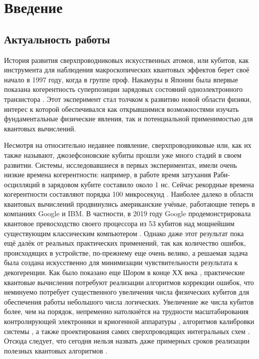 \documentclass[14pt, a4paper]{extreport}
\numberwithin{equation}{section}
\begin{document}
\tableofcontents

\chapter*{Введение}

\section*{Актуальность работы}

История развития сверхпроводниковых искусственных атомов, или кубитов, как инструмента для наблюдения макроскопических квантовых эффектов берет своё начало в 1997 году, когда в группе проф. Накамуры в Японии была впервые показана когерентность суперпозиции зарядовых состояний одноэлектронного транзистора \cite{nakamura1997spectroscopy}. Этот эксперимент стал толчком к развитию новой области физики, интерес к которой обеспечивался как открывшимися возможностями изучать фундаментальные физические явления, так и потенциальной применимостью для квантовых вычислений.

Несмотря на относительно недавнее появление, сверхпроводниковые или, как их также называют, джозефсоновские кубиты прошли уже много стадий в своем развитии. Системы, исследовавшиеся в первых экспериментах, имели очень низкие времена когерентности: например, в работе \cite{nakamura1999coherent} время затухания Раби-осцилляций в зарядовом кубите составило около 1 нс. Сейчас рекордные времена когерентности составляют порядка 100 микросекунд \cite{kjaergaard2020superconducting}. Наиболее далеко в области квантовых вычислений продвинулись американские учёные, работающие теперь в компаниях Google и IBM. В частности, в 2019 году Google продемонстрировала квантовое превосходство своего процессора из 53 кубитов над мощнейшим существующим классическим компьютером \cite{arute2019quantum}. Однако даже этот результат пока ещё далёк от реальных практических применений, так как количество ошибок, происходящих в устройстве, по-прежнему еще очень велико, а решаемая задача была создана искусственно для минимизации чувствительности результата к декогеренции. Как было показано еще Шором в конце ХХ века \cite{shor1995scheme}, практические квантовые вычисления потребуют реализации алгоритмов коррекции ошибок, что неминуемо потребует существенного увеличения числа физических кубитов для обеспечения работы небольшого числа логических. Увеличение же числа кубитов более, чем на порядок, непременно натолкнётся на трудности масштабирования контролирующей электроники и криогенной аппаратуры \cite{krinner2019engineering}, алгоритмов калибровки системы \cite{arute2019quantum, kelly2018physical}, а также проектирования самих сверхпроводящих интегральных схем \cite{hutchings2017tunable}. Отсюда следует, что сегодня нельзя назвать даже примерных сроков реализации полезных квантовых алгоритмов \cite{arute2019quantum}.
\end{document}
